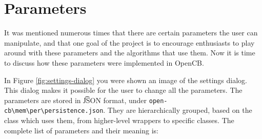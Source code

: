 
\section{Parameters} \label{sec:parameters}

It was mentioned numerous times that there are certain parameters the user can manipulate, and that one goal of the project is to encourage enthusiasts to play around with these parameters and the algorithms that use them. Now it is time to discuss how these parameters were implemented in OpenCB.

In Figure \ref{fig:settings-dialog} you were shown an image of the settings dialog. This dialog makes it possible for the user to change all the parameters. The parameters are stored in \t{JSON} format, under \verb|open-cb\mem\per\persistence.json|. They are hierarchically grouped, based on the class which uses them, from higher-level wrappers to specific classes. The complete list of parameters and their meaning is:

